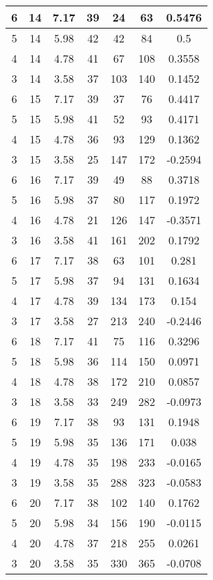 \documentclass[letterpaper, 12pt]{article}
\begin{document}
\begin{longtable}{|c|c|c|c|c|c|c|}
\hline
6 & 14 & 7.17 & 39 & 24 & 63 & 0.5476 \\
\hline
5 & 14 & 5.98 & 42 & 42 & 84 & 0.5 \\
\hline
4 & 14 & 4.78 & 41 & 67 & 108 & 0.3558 \\
\hline
3 & 14 & 3.58 & 37 & 103 & 140 & 0.1452 \\
\hline
6 & 15 & 7.17 & 39 & 37 & 76 & 0.4417 \\
\hline
5 & 15 & 5.98 & 41 & 52 & 93 & 0.4171 \\
\hline
4 & 15 & 4.78 & 36 & 93 & 129 & 0.1362 \\
\hline
3 & 15 & 3.58 & 25 & 147 & 172 & -0.2594 \\
\hline
6 & 16 & 7.17 & 39 & 49 & 88 & 0.3718 \\
\hline
5 & 16 & 5.98 & 37 & 80 & 117 & 0.1972 \\
\hline
4 & 16 & 4.78 & 21 & 126 & 147 & -0.3571 \\
\hline
3 & 16 & 3.58 & 41 & 161 & 202 & 0.1792 \\
\hline
6 & 17 & 7.17 & 38 & 63 & 101 & 0.281 \\
\hline
5 & 17 & 5.98 & 37 & 94 & 131 & 0.1634 \\
\hline
4 & 17 & 4.78 & 39 & 134 & 173 & 0.154 \\
\hline
3 & 17 & 3.58 & 27 & 213 & 240 & -0.2446 \\
\hline
6 & 18 & 7.17 & 41 & 75 & 116 & 0.3296 \\
\hline
5 & 18 & 5.98 & 36 & 114 & 150 & 0.0971 \\
\hline
4 & 18 & 4.78 & 38 & 172 & 210 & 0.0857 \\
\hline
3 & 18 & 3.58 & 33 & 249 & 282 & -0.0973 \\
\hline
6 & 19 & 7.17 & 38 & 93 & 131 & 0.1948 \\
\hline
5 & 19 & 5.98 & 35 & 136 & 171 & 0.038 \\
\hline
4 & 19 & 4.78 & 35 & 198 & 233 & -0.0165 \\
\hline
3 & 19 & 3.58 & 35 & 288 & 323 & -0.0583 \\
\hline
6 & 20 & 7.17 & 38 & 102 & 140 & 0.1762 \\
\hline
5 & 20 & 5.98 & 34 & 156 & 190 & -0.0115 \\
\hline
4 & 20 & 4.78 & 37 & 218 & 255 & 0.0261 \\
\hline
3 & 20 & 3.58 & 35 & 330 & 365 & -0.0708 \\
\hline
\end{longtable}
\end{document}

